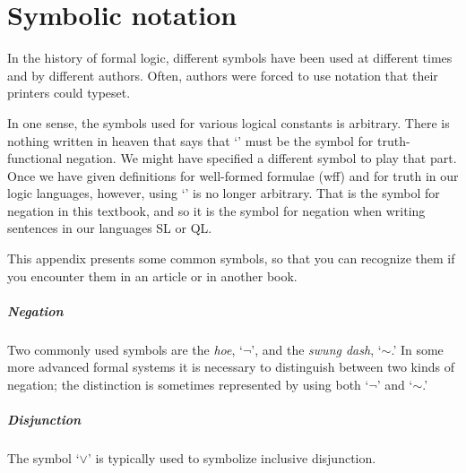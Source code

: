 \chapter[Other symbolic notation]{Symbolic notation}
\label{app.notation}


In the history of formal logic, different symbols have been used at different times and by different authors. Often, authors were forced to use notation that their printers could typeset.

In one sense, the symbols used for various logical constants is arbitrary. There is nothing written in heaven that says that `\enot' must be the symbol for truth-functional negation. We might have specified a different symbol to play that part. Once we have given definitions for well-formed formulae (wff) and for truth in our logic languages, however, using `\enot' is no longer arbitrary. That is the symbol for negation in this textbook, and so it is the symbol for negation when writing sentences in our languages SL or QL.

This appendix presents some common symbols, so that you can recognize them if you encounter them in an article or in another book.

\paragraph{Negation} Two commonly used symbols are the \emph{hoe}, `$\neg$', and the \emph{swung dash}, `${\sim}$.' In some more advanced formal systems it is necessary to distinguish between two kinds of negation; the distinction is sometimes represented by using both `$\neg$' and `${\sim}$.'

\paragraph{Disjunction} The symbol `$\vee$' is typically used to symbolize inclusive disjunction. %

